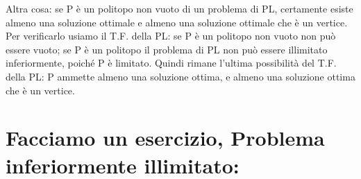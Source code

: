 \vspace{1cm}

\noindent Altra cosa: se P è un politopo non vuoto di un problema di PL, certamente esiste almeno una soluzione ottimale e almeno una soluzione ottimale che è un vertice. Per verificarlo usiamo il T.F. della PL: se P è un politopo non vuoto non può essere vuoto; se P è un politopo il problema di PL non può essere illimitato inferiormente, poiché P è limitato. Quindi rimane l'ultima possibilità del T.F. della PL: P ammette almeno una soluzione ottima, e almeno una soluzione ottima che è un vertice.

\newpage

\section{Facciamo un esercizio, Problema inferiormente illimitato:}


